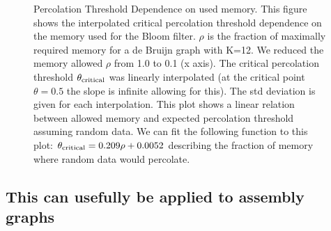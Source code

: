 \documentclass[12pt]{article} \usepackage{simplemargins}
\begin{document}
\begin{figure}
\caption{
Percolation Threshold Dependence on used memory. This figure shows the
interpolated critical percolation threshold dependence on the memory used for
the Bloom filter. $\rho$ is the fraction of maximally required memory for a de
Bruijn graph with K=12. We reduced the memory allowed $\rho$ from 1.0 to 0.1  (x
axis). The critical percolation threshold $\theta_{\rm critical}$ was linearly
interpolated (at the critical point $\theta=0.5$ the slope is infinite allowing
for this). The std deviation is given for each interpolation. This plot shows a
linear relation between allowed memory and expected percolation threshold
assuming random data. We can fit the following function to this plot:
$\theta_{\rm critical} = 0.209 \rho + 0.0052$ describing the fraction of memory
where random data would percolate.
}
\end{figure}

\subsection{This can usefully be applied to assembly graphs}
\end{document}
